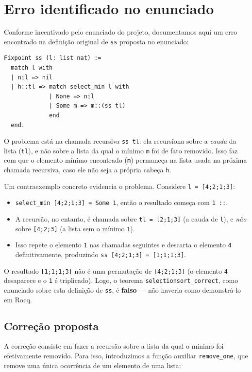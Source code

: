 \documentclass{article}
\begin{document}
\section{Erro identificado no enunciado}
\label{sec:bug}

Conforme incentivado pelo enunciado do projeto, documentamos aqui um erro
encontrado na definição original de \texttt{ss} proposta no enunciado:

\begin{verbatim}
Fixpoint ss (l: list nat) :=
  match l with
  | nil => nil
  | h::tl => match select_min l with
             | None => nil
             | Some m => m::(ss tl)
             end
  end.
\end{verbatim}

O problema está na chamada recursiva \texttt{ss tl}: ela recursiona sobre a
\emph{cauda} da lista (\texttt{tl}), e não sobre a lista da qual o mínimo
\texttt{m} foi de fato removido. Isso faz com que o elemento mínimo
encontrado (\texttt{m}) permaneça na lista usada na próxima chamada
recursiva, caso ele não seja a própria cabeça \texttt{h}.

Um contraexemplo concreto evidencia o problema. Considere
\texttt{l = [4;2;1;3]}:

\begin{itemize}
  \item \texttt{select\_min [4;2;1;3] = Some 1}, então o resultado começa com
        \texttt{1 ::}.
  \item A recursão, no entanto, é chamada sobre \texttt{tl = [2;1;3]} (a
        cauda de \texttt{l}), e \emph{não} sobre \texttt{[4;2;3]} (a lista
        sem o mínimo \texttt{1}).
  \item Isso repete o elemento \texttt{1} nas chamadas seguintes e descarta
        o elemento \texttt{4} definitivamente, produzindo
        \texttt{ss [4;2;1;3] = [1;1;1;3]}.
\end{itemize}

O resultado \texttt{[1;1;1;3]} não é uma permutação de \texttt{[4;2;1;3]}
(o elemento \texttt{4} desaparece e o \texttt{1} é triplicado). Logo, o
teorema \texttt{selectionsort\_correct}, como enunciado sobre esta definição
de \texttt{ss}, é \textbf{falso} — não haveria como demonstrá-lo em Rocq.

\subsection{Correção proposta}

A correção consiste em fazer a recursão sobre a lista da qual o mínimo foi
efetivamente removido. Para isso, introduzimos a função auxiliar
\texttt{remove\_one}, que remove uma única ocorrência de um elemento de uma
lista:
\end{document}
